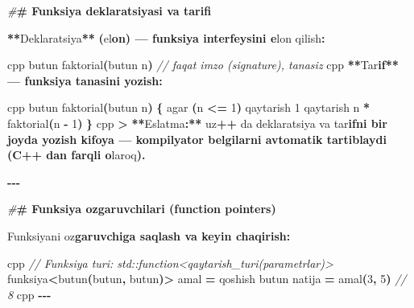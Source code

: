 \documentclass[a4paper,11pt,twoside,openright]{book}
\newenvironment{Shaded}{\begin{snugshade}}{\end{snugshade}}
\newcommand{\CharTok}[1]{\textcolor[rgb]{0.31,0.60,0.02}{#1}}
\newcommand{\CommentTok}[1]{\textcolor[rgb]{0.56,0.35,0.01}{\textit{#1}}}
\newcommand{\DecValTok}[1]{\textcolor[rgb]{0.00,0.00,0.81}{#1}}
\newcommand{\ErrorTok}[1]{\textcolor[rgb]{0.64,0.00,0.00}{\textbf{#1}}}
\newcommand{\NormalTok}[1]{#1}
\newcommand{\OperatorTok}[1]{\textcolor[rgb]{0.81,0.36,0.00}{\textbf{#1}}}
\newcommand{\PreprocessorTok}[1]{\textcolor[rgb]{0.56,0.35,0.01}{\textit{#1}}}
\begin{document}
\begin{Shaded}
\begin{Highlighting}[]
\PreprocessorTok{\#}\ErrorTok{\# Funksiya deklaratsiyasi va ta\textquotesingle{}rifi}

\OperatorTok{**}\NormalTok{Deklaratsiya}\OperatorTok{**} \OperatorTok{(}\NormalTok{e}\CharTok{\textquotesingle{}l}\ErrorTok{on) — funksiya interfeysini e}\CharTok{\textquotesingle{}}\NormalTok{lon qilish}\OperatorTok{:}

\ErrorTok{\textasciigrave{}\textasciigrave{}\textasciigrave{}}\NormalTok{cpp}
\NormalTok{butun faktorial}\OperatorTok{(}\NormalTok{butun n}\OperatorTok{)}   \CommentTok{// faqat imzo (signature), tanasiz}
\ErrorTok{\textasciigrave{}\textasciigrave{}\textasciigrave{}}\NormalTok{cpp}
\OperatorTok{**}\NormalTok{Ta}\CharTok{\textquotesingle{}r}\ErrorTok{if** — funksiya tanasini yozish:}

\ErrorTok{\textasciigrave{}\textasciigrave{}\textasciigrave{}}\NormalTok{cpp}
\NormalTok{butun faktorial}\OperatorTok{(}\NormalTok{butun n}\OperatorTok{)} \OperatorTok{\{}
\NormalTok{    agar }\OperatorTok{(}\NormalTok{n }\OperatorTok{\textless{}=} \DecValTok{1}\OperatorTok{)}\NormalTok{ qaytarish }\DecValTok{1}
\NormalTok{    qaytarish n }\OperatorTok{*}\NormalTok{ faktorial}\OperatorTok{(}\NormalTok{n }\OperatorTok{{-}} \DecValTok{1}\OperatorTok{)}
\OperatorTok{\}}
\ErrorTok{\textasciigrave{}\textasciigrave{}\textasciigrave{}}\NormalTok{cpp}
\OperatorTok{\textgreater{}} \OperatorTok{**}\NormalTok{Eslatma}\OperatorTok{:**}\NormalTok{ uz}\OperatorTok{++}\NormalTok{ da deklaratsiya va ta}\CharTok{\textquotesingle{}r}\ErrorTok{ifni bir joyda yozish kifoya — kompilyator belgilarni avtomatik tartiblaydi (C++ dan farqli o}\CharTok{\textquotesingle{}}\NormalTok{laroq}\OperatorTok{).}

\OperatorTok{{-}{-}{-}}

\PreprocessorTok{\#}\ErrorTok{\# Funksiya o\textquotesingle{}zgaruvchilari (function pointers)}

\NormalTok{Funksiyani o}\CharTok{\textquotesingle{}z}\ErrorTok{garuvchiga saqlash va keyin chaqirish:}

\ErrorTok{\textasciigrave{}\textasciigrave{}\textasciigrave{}}\NormalTok{cpp}
\CommentTok{// Funksiya turi: std::function\textless{}qaytarish\_turi(parametrlar)\textgreater{}}
\NormalTok{funksiya}\OperatorTok{\textless{}}\NormalTok{butun}\OperatorTok{(}\NormalTok{butun}\OperatorTok{,}\NormalTok{ butun}\OperatorTok{)\textgreater{}}\NormalTok{ amal }\OperatorTok{=}\NormalTok{ qoshish}
\NormalTok{butun natija }\OperatorTok{=}\NormalTok{ amal}\OperatorTok{(}\DecValTok{3}\OperatorTok{,} \DecValTok{5}\OperatorTok{)}   \CommentTok{// 8}
\ErrorTok{\textasciigrave{}\textasciigrave{}\textasciigrave{}}\NormalTok{cpp}
\OperatorTok{{-}{-}{-}}


\end{Highlighting}
\end{Shaded}
\end{document}
